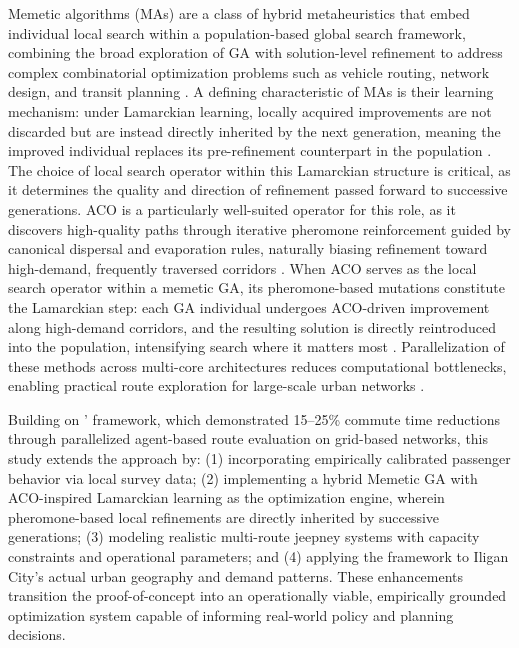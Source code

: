 {Memetic algorithms (MAs) are a class of hybrid metaheuristics that embed individual local search within a population-based global search framework, combining the broad exploration of \ac{GA} with solution-level refinement to address complex combinatorial optimization problems such as vehicle routing, network design, and transit planning \citep{ong2004}. A defining characteristic of MAs is their learning mechanism: under Lamarckian learning, locally acquired improvements are not discarded but are instead directly inherited by the next generation, meaning the improved individual replaces its pre-refinement counterpart in the population \citep{ong2004}. The choice of local search operator within this Lamarckian structure is critical, as it determines the quality and direction of refinement passed forward to successive generations. \ac{ACO} is a particularly well-suited operator for this role, as it discovers high-quality paths through iterative pheromone reinforcement guided by canonical dispersal and evaporation rules, naturally biasing refinement toward high-demand, frequently traversed corridors \citep{wu2024, korzen2024}. When \ac{ACO} serves as the local search operator within a memetic \ac{GA}, its pheromone-based mutations constitute the Lamarckian step: each \ac{GA} individual undergoes \ac{ACO}-driven improvement along high-demand corridors, and the resulting solution is directly reintroduced into the population, intensifying search where it matters most \citep{yoo2024, rodriguez-esparza2024}. Parallelization of these methods across multi-core architectures reduces computational bottlenecks, enabling practical route exploration for large-scale urban networks \citep{wens2025, chaves2024}.

Building on \citet{sanchez2025}' framework, which demonstrated 15--25\% commute time reductions through parallelized agent-based route evaluation on grid-based networks, this study extends the approach by: (1) incorporating empirically calibrated passenger behavior via local survey data; (2) implementing a hybrid Memetic \ac{GA} with \ac{ACO}-inspired Lamarckian learning as the optimization engine, wherein pheromone-based local refinements are directly inherited by successive generations; (3) modeling realistic multi-route jeepney systems with capacity constraints and operational parameters; and (4) applying the framework to Iligan City's actual urban geography and demand patterns. These enhancements transition the proof-of-concept into an operationally viable, empirically grounded optimization system capable of informing real-world policy and planning decisions.}

